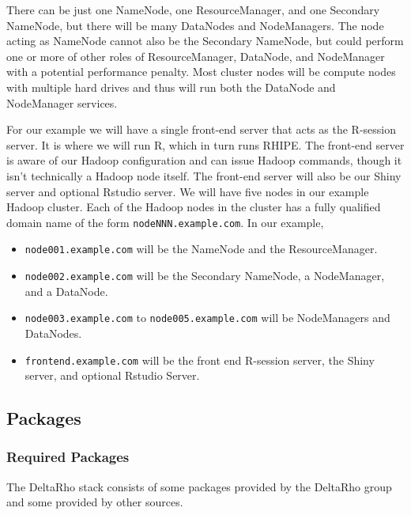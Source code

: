 There can be just one NameNode, one ResourceManager, and one Secondary
NameNode, but there will be many DataNodes and NodeManagers.  The node
acting as NameNode cannot also be the Secondary NameNode, but could
perform one or more of other roles of ResourceManager, DataNode, and
NodeManager with a potential  performance penalty.  Most cluster nodes
will be compute nodes with multiple hard drives and thus will run both
the DataNode and NodeManager services.

For our example we will have a single front-end server that acts as the
R-session server.  It is where we will run R, which in turn runs RHIPE.
The front-end server is aware of our Hadoop configuration and can issue
Hadoop commands, though it isn't technically a Hadoop node itself. The
front-end server will also be our Shiny server and optional Rstudio
server.  We will have five nodes in our example Hadoop cluster.  Each of
the Hadoop nodes in the cluster has a fully qualified domain
name of the form \verb|nodeNNN.example.com|. In our example,

\begin{itemize}
\item \verb|node001.example.com| will be the NameNode and the ResourceManager.
\item \verb|node002.example.com| will be the Secondary NameNode, a NodeManager, and a DataNode.
\item \verb|node003.example.com| to \verb|node005.example.com| will be NodeManagers and DataNodes.
\item \verb|frontend.example.com| will be the front end R-session server, the Shiny server, and optional Rstudio Server.
\end{itemize}

\subsection{Packages}
\subsubsection{Required Packages}
The DeltaRho stack consists of some packages provided by the DeltaRho group and some provided by other sources. \\

